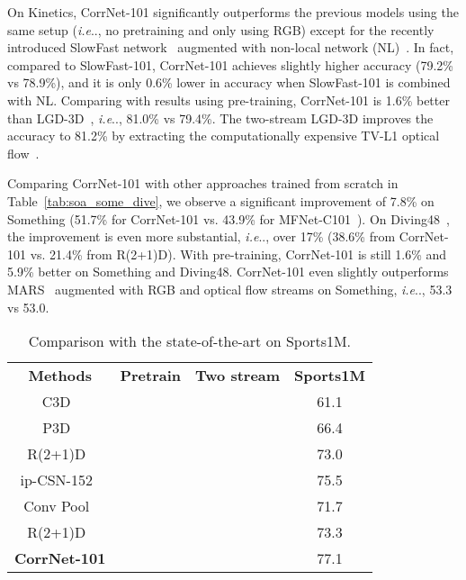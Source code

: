\documentclass[10pt,twocolumn,letterpaper]{article}
\makeatletter
\DeclareRobustCommand\onedot{\futurelet\@let@token\@onedot}
\def\@onedot{\ifx\@let@token.\else.\null\fi\xspace}
\def\ie{\emph{i.e}\onedot} \def\Ie{\emph{I.e}\onedot}
\makeatother
\begin{document}
On Kinetics, CorrNet-101 significantly outperforms the previous models using the same setup (\ie, no pretraining and only using RGB) except for the recently introduced SlowFast network~\cite{feichtenhofer2019slowfast} augmented with non-local network (NL)~\cite{wang2017non}. In fact, compared to SlowFast-101, CorrNet-101 achieves slightly higher accuracy  (79.2\% vs 78.9\%), and it is only 0.6\% lower in accuracy when SlowFast-101 is combined with NL. Comparing with results using pre-training, CorrNet-101 is 1.6\% better than LGD-3D~\cite{qiu2019learning}, \ie, 81.0\% vs 79.4\%. The two-stream LGD-3D improves the accuracy to 81.2\% by extracting the computationally expensive TV-L1 optical flow~\cite{zach2007duality}.

Comparing CorrNet-101 with other approaches trained from scratch in Table~\ref{tab:soa_some_dive},  we observe a significant improvement of 7.8\% on Something (51.7\% for CorrNet-101 vs. 43.9\% for MFNet-C101~\cite{lee2018motion}). On Diving48~\cite{li2018resound}, the improvement is even more substantial, \ie, over 17\% (38.6\% from CorrNet-101 vs. 21.4\% from R(2+1)D). With pre-training, CorrNet-101 is still 1.6\% and 5.9\% better on Something and Diving48. CorrNet-101 even slightly outperforms MARS~\cite{crasto2019mars} augmented with RGB and optical flow streams on Something, \ie, 53.3 vs 53.0.

\begin{table} [t] 
\centering
		\begin{tabular}{cccc} \hline
			{\bf Methods}  & {\bf Pretrain} & {\bf Two stream} & {\bf Sports1M}  \\ \shline 
			C3D~\cite{Tran15} &  \redxmark   &  \redxmark &  61.1 \\
			P3D~\cite{P3D}  &  \redxmark  &  \redxmark &  66.4 \\
			R(2+1)D~\cite{tran2017closer} &  \redxmark  & 	\redxmark	& 73.0 \\
			ip-CSN-152~\cite{tran2019video} &  \redxmark  & \redxmark  & 75.5 \\ \hline
			Conv Pool~\cite{yue2015beyond} &  \redxmark & \greencmark & 71.7 \\
			R(2+1)D~\cite{tran2017closer} &  \redxmark & 	\greencmark	& 73.3 \\			
			\hline \hline
			{\bf CorrNet-101} &  \redxmark  & \redxmark &  77.1  \\  \hline 
		\end{tabular}
	\caption{Comparison with the state-of-the-art on Sports1M.} 
	\label{tab:soa_sports1m}
\end{table}
\end{document}
